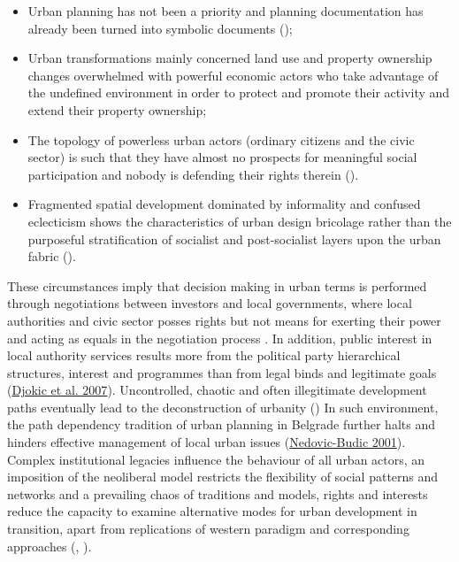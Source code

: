 \documentclass[11pt]{report}
\begin{document}
\begin{itemize}
\item Urban planning has not been a priority \href{}{\citealt{sykora_transitional_1999}} and planning documentation has already been turned into symbolic documents (\cite{Nedovic-Budic 2001});

\item Urban transformations mainly concerned land use and property ownership changes overwhelmed with powerful economic actors who take advantage of the undefined environment in order to protect and promote their activity and extend their property ownership;
 
\item The topology of powerless urban actors (ordinary citizens and the civic sector) is such that they have almost no prospects for meaningful social participation and nobody is defending their rights therein (\href{}{\citealt{vujovic_belgrades_2007}}).

\item Fragmented spatial development dominated by informality and confused eclecticism shows the characteristics of urban design bricolage rather than the purposeful stratification of socialist and post-socialist layers upon the urban fabric (\href{}{\citealt{hirt_belgrade_2009}}). 
\end{itemize}

These circumstances imply that decision making in urban terms is performed through negotiations between investors and local governments, where local authorities and civic sector posses rights but not means for exerting their power and acting as equals in the negotiation process \href{}{\citealt{bajec_rational_2009}}.
In addition, public interest in local authority services results more from the political party hierarchical structures, interest and programmes than from legal binds and legitimate goals (\href{}{Djokic et al. 2007}).
Uncontrolled, chaotic and often illegitimate development paths eventually lead to the deconstruction of urbanity (\href{}{\citealt{vujovic_belgrades_2007}})
In such environment, the path dependency tradition of urban planning in Belgrade further halts and hinders effective management of local urban issues (\href{}{Nedovic-Budic 2001}).
Complex institutional legacies influence the behaviour of all urban actors, an imposition of the neoliberal model restricts the flexibility of social patterns and networks and a prevailing chaos of traditions and models, rights and interests reduce the capacity to examine alternative modes for urban development in transition, apart from replications of western paradigm and corresponding approaches 
(\href{}{\citealt{tsenkova_urban_2007}}, \href{}{\citealt{petrovic_cities_2009}}).
   
\end{document}
